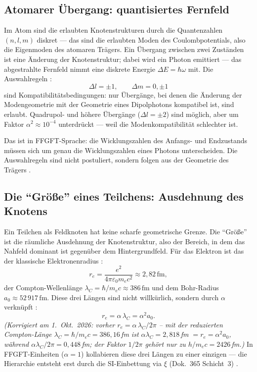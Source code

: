 \subsection*{Atomarer Übergang: quantisiertes Fernfeld}

Im Atom sind die erlaubten Knotenstrukturen durch die Quantenzahlen
$(n, l, m)$ diskret --- das sind die erlaubten Moden des Coulombpotentials,
also die Eigenmoden des atomaren Trägers. Ein Übergang zwischen zwei
Zuständen ist eine Änderung der Knotenstruktur; dabei wird ein Photon
emittiert --- das abgestrahlte Fernfeld nimmt eine diskrete Energie
$\Delta E = \hbar\omega$ mit. Die Auswahlregeln \cite{CohenTannoudji1977,Griffiths1995}:
\[
  \Delta l = \pm 1, \qquad \Delta m = 0,\pm 1
\]
sind Kom\-pa\-ti\-bi\-li\-täts\-be\-din\-gun\-gen: nur Übergänge, bei denen die
Änderung der Modengeometrie mit der Geometrie eines Dipolphotons
kompatibel ist, sind erlaubt. Quadrupol- und höhere Übergänge
($\Delta l = \pm 2$) sind möglich, aber um Faktor $\alpha^2 \approx 10^{-4}$
unterdrückt --- weil die Modenkompatibilität schlechter ist.

Das ist in FFGFT-Sprache: die Wicklungszahlen des Anfangs- und
Endzustands müssen sich um genau die Wicklungszahlen eines Photons
unterscheiden. Die Auswahlregeln sind nicht postuliert, sondern
folgen aus der Geometrie des Trägers \SM.

\subsection*{Die ``Größe'' eines Teilchens: Ausdehnung des Knotens}

Ein Teilchen als Feldknoten hat keine scharfe geometrische Grenze.
Die ``Größe'' ist die räumliche Ausdehnung der Knotenstruktur,
also der Bereich, in dem das Nahfeld dominant ist gegenüber dem
Hintergrundfeld. Für das Elektron ist das der klassische
Elektronenradius \EM:
\[
  r_e = \frac{e^2}{4\pi\varepsilon_0 m_e c^2} \approx 2{,}82\,\mathrm{fm},
\]
der Compton-Wellenlänge $\lambda_C = \hbar/m_e c \approx 386\,\mathrm{fm}$
und dem Bohr-Radius $a_0 \approx 52\,917\,\mathrm{fm}$. Diese drei
Längen sind nicht willkürlich, sondern durch $\alpha$ verknüpft \cite{Jackson1999,PascherDok365}:
\[
  r_e = \alpha\,\lambda_C = \alpha^2 a_0.
\]
\textit{(Korrigiert am 1.~Okt.~2026: vorher $r_e = \alpha\,\lambda_C/2\pi$ -- mit der reduzierten Compton-Länge $\lambda_C = \hbar/m_ec = 386{,}16$\,fm ist $\alpha\lambda_C = 2{,}818$\,fm $= r_e = \alpha^2a_0$, während $\alpha\lambda_C/2\pi = 0{,}448$\,fm; der Faktor $1/2\pi$ gehört nur zu $h/m_ec = 2426$\,fm.)}
In FFGFT-Einheiten ($\alpha=1$) kollabieren diese drei Längen zu einer
einzigen --- die Hierarchie entsteht erst durch die SI-Einbettung via
$\xi$ (Dok.~365 Schicht~3) \KM.

